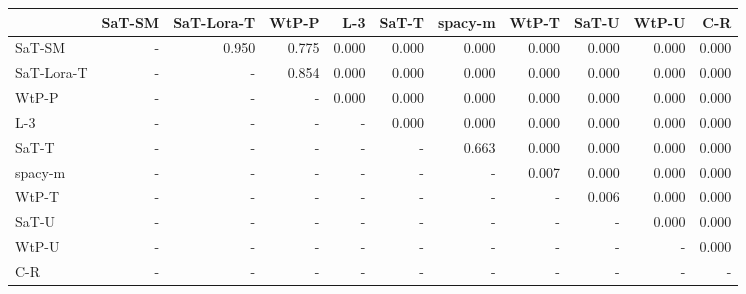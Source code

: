 \begin{tabular}{lrrrrrrrrrr}
\toprule
 & SaT-SM & SaT-Lora-T & WtP-P & L-3 & SaT-T & spacy-m & WtP-T & SaT-U & WtP-U & C-R \\
\midrule
SaT-SM & - & 0.950 & 0.775 & 0.000 & 0.000 & 0.000 & 0.000 & 0.000 & 0.000 & 0.000 \\
SaT-Lora-T & - & - & 0.854 & 0.000 & 0.000 & 0.000 & 0.000 & 0.000 & 0.000 & 0.000 \\
WtP-P & - & - & - & 0.000 & 0.000 & 0.000 & 0.000 & 0.000 & 0.000 & 0.000 \\
L-3 & - & - & - & - & 0.000 & 0.000 & 0.000 & 0.000 & 0.000 & 0.000 \\
SaT-T & - & - & - & - & - & 0.663 & 0.000 & 0.000 & 0.000 & 0.000 \\
spacy-m & - & - & - & - & - & - & 0.007 & 0.000 & 0.000 & 0.000 \\
WtP-T & - & - & - & - & - & - & - & 0.006 & 0.000 & 0.000 \\
SaT-U & - & - & - & - & - & - & - & - & 0.000 & 0.000 \\
WtP-U & - & - & - & - & - & - & - & - & - & 0.000 \\
C-R & - & - & - & - & - & - & - & - & - & - \\
\bottomrule
\end{tabular}

